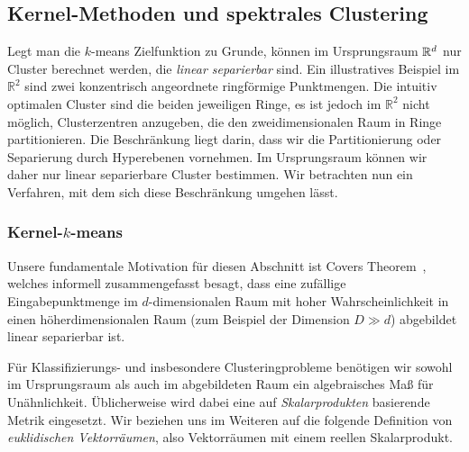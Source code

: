 \subsection{Kernel-Methoden und spektrales Clustering}
\label{subsection:basics:kernel-spectral}

Legt man die $k$-means Zielfunktion zu Grunde, können im Ursprungsraum $\mathbb{R}^{d}$ nur Cluster berechnet werden, die \emph{linear
separierbar} sind. Ein illustratives Beispiel im $\mathbb{R}^2$ sind zwei konzentrisch angeordnete ringförmige Punktmengen.
Die intuitiv optimalen Cluster sind die beiden jeweiligen Ringe, es ist jedoch im $\mathbb{R}^2$ nicht
möglich, Clusterzentren anzugeben, die den zweidimensionalen Raum in Ringe partitionieren. Die Beschränkung liegt darin, dass
wir die Partitionierung oder Separierung durch Hyperebenen vornehmen. Im Ursprungsraum können wir daher nur linear separierbare
Cluster bestimmen. Wir betrachten nun ein Verfahren, mit dem sich diese Beschränkung umgehen lässt.

\subsubsection{Kernel-\texorpdfstring{$k$}{k}-means}

Unsere fundamentale Motivation für diesen Abschnitt ist Covers Theorem~\cite{Cover65}, welches informell zusammengefasst besagt,
dass eine zufällige Eingabepunktmenge im $d$-dimensionalen Raum mit hoher Wahrscheinlichkeit in einen höherdimensionalen
Raum (zum Beispiel der Dimension $D \gg d$) abgebildet linear separierbar ist.

Für Klassifizierungs- und insbesondere Clusteringprobleme benötigen wir sowohl im Ursprungsraum als auch im abgebildeten Raum
ein algebraisches Maß für Unähnlichkeit. Üblicherweise wird dabei eine auf \emph{Skalarprodukten} basierende Metrik eingesetzt.
Wir beziehen uns im Weiteren auf die folgende Definition von \emph{euklidischen Vektorräumen}, also Vektorräumen mit einem
reellen Skalarprodukt.

